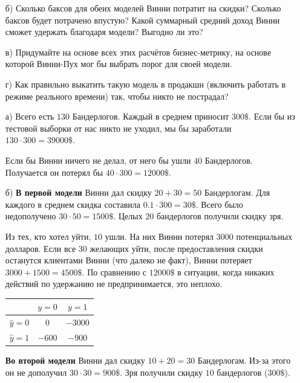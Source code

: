 \documentclass[12pt, a4paper, oneside]{article}
\theoremstyle{plain} %
\theoremstyle{definition}
\newcounter{problem}%
\renewcommand{\theproblem}{\arabic{problem}}
\newenvironment{problem}{
\addtocounter{problem}{1}\noindent{ \color{titleblue} \large \bfseries Упражнение~\theproblem \vspace{1ex} \newline}
}{ }
\begin{document}
\begin{problem}
\begin{enumerate}
\item[б)] Сколько баксов для обеих моделей Винни потратит на скидки? Сколько баксов будет потрачено впустую? Какой суммарный средний доход Винни сможет удержать благодаря модели? Выгодно ли это?  

\item[в)] Придумайте на основе всех этих расчётов бизнес-метрику, на основе которой Винни-Пух мог бы выбрать порог для своей модели. 

\item[г)] Как правильно выкатить такую модель в продакшн (включить работать в режиме реального времени) так, чтобы никто не пострадал? 
\end{enumerate} 
\end{problem} 

\begin{solution}
\begin{enumerate} 
\item[а)] Всего есть $130$ Бандерлогов. Каждый в среднем приносит $300\$$. Если бы из тестовой выборки от нас никто не уходил, мы бы заработали $130 \cdot 300 = 39000\$$.

Если бы Винни ничего не делал, от него бы ушли $40$ Бандерлогов. Получается он потерял бы  $40 \cdot 300 = 12000\$$.

\item[б)] \textbf{В первой модели} Винни дал скидку $20 + 30 = 50$ Бандерлогам. Для каждого в среднем скидка составила $0.1 \cdot 300 = 30\$$. Всего было недополучено $30 \cdot 50 = 1500\$$. Целых $20$ бандерлогов получили скидку зря. 

Из тех, кто хотел уйти, $10$ ушли. На них Винни потерял $3000$ потенциальных долларов. Если все $30$ желающих уйти, после предоставления скидки останутся клиентами Винни (что далеко не факт),  Винни потеряет $3000 + 1500 = 4500\$$. По сравнению с $12000\$$ в ситуации, когда никаких действий по удержанию не предпринимается, это неплохо.

\begin{center} 
\begin{tabular}{|c|c|c|}
	\hline
	& $y=0$  &  $ y = 1$ \\  \hline 
	$\hat y = 0$  &   $0$ &    $-3000$ \\      \hline 
	$\hat y = 1$ &   $-600$ &  $-900$ \\      \hline
\end{tabular}
\end{center} 

\textbf{Во второй модели} Винни дал скидку $10 + 20 = 30$ Бандерлогам. Из-за этого он не дополучил $30 \cdot 30 = 900\$$.  Зря получили скидку $10$ бандерлогов ($300\$$). 


\end{enumerate}
\end{solution}
\end{document}
